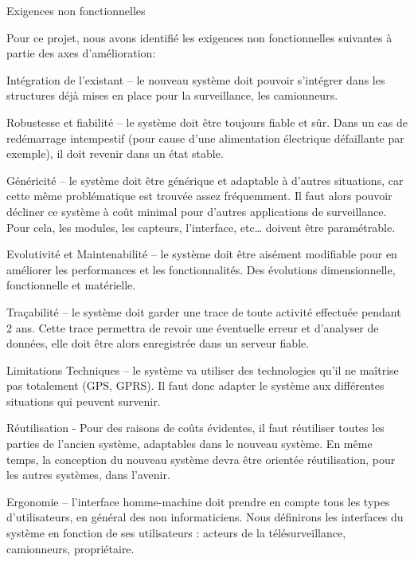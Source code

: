 ﻿Exigences non fonctionnelles

Pour ce projet, nous avons identifié les exigences non fonctionnelles suivantes à partie des axes d’amélioration:

Intégration de l’existant – le nouveau système doit pouvoir s’intégrer dans les structures déjà mises en place pour la surveillance, les camionneurs.

Robustesse et fiabilité – le système doit être toujours fiable et sûr. Dans un cas de redémarrage intempestif (pour cause d’une alimentation électrique défaillante par exemple), il doit revenir dans un état stable.

Généricité – le système doit être générique et adaptable à d’autres situations, car cette même problématique est trouvée assez fréquemment. Il faut alors pouvoir décliner ce système à coût minimal pour d’autres applications de surveillance. Pour cela, les modules, les capteurs, l’interface, etc… doivent être paramétrable.

Evolutivité et Maintenabilité – le système doit être aisément modifiable pour en améliorer les performances et les fonctionnalités. Des évolutions dimensionnelle, fonctionnelle et matérielle.

Traçabilité – le système doit garder une trace de toute activité effectuée pendant 2 ans. Cette trace permettra de revoir une éventuelle erreur et d’analyser de données, elle doit être alors enregistrée dans un serveur fiable.

Limitations Techniques – le système va utiliser des technologies qu'il ne maîtrise pas totalement (GPS, GPRS). Il faut donc adapter le système aux différentes situations qui peuvent survenir.

Réutilisation - Pour des raisons de coûts évidentes, il faut réutiliser toutes les parties de l'ancien système, adaptables dans le nouveau système. En même temps, la conception du nouveau système devra être orientée réutilisation, pour les autres systèmes, dans l'avenir.

Ergonomie – l'interface homme-machine doit prendre en compte tous les types d'utilisateurs, en général des non informaticiens. Nous définirons les interfaces du système en fonction de ses utilisateurs : acteurs de la télésurveillance, camionneurs, propriétaire.